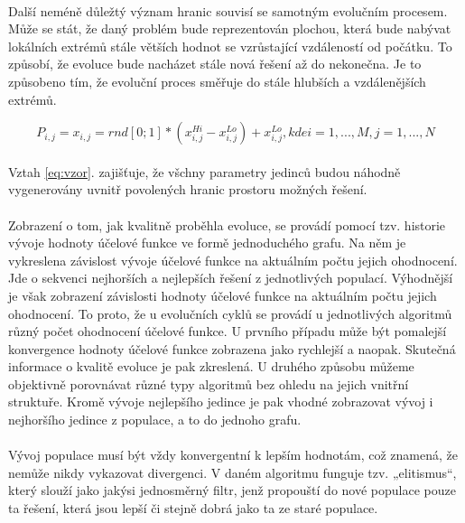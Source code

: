 \documentclass[bc,male,java,dept460]{diploma}		%
\begin{document}
\paragraph*{}
Další neméně důležtý význam hranic souvisí se samotným evolučním procesem. Může se stát, že daný problém bude reprezentován plochou, která bude nabývat lokálních extrémů stále větších hodnot se vzrůstající vzdáleností od počátku. To způsobí, že evoluce bude nacházet stále nová řešení až do nekonečna. Je to způsobeno tím, že evoluční proces směřuje do stále hlubších a vzdálenějších extrémů.

\begin{equation}
P_{i,j}=x_{i,j}=rnd[0;1]*(x_{i,j}^{Hi}-x_{i,j}^{Lo})+x_{i,j}^{Lo}, kde i=1,...,M, j=1,...,N
\label{eq:vzor}
\end{equation}


\paragraph*{}
Vztah \ref{eq:vzor}. zajišťuje, že všchny parametry jedinců budou náhodně vygenerovány uvnitř povolených hranic prostoru možných řešení.

\paragraph*{}
Zobrazení o tom, jak kvalitně proběhla evoluce, se provádí pomocí tzv. historie vývoje hodnoty účelové funkce ve formě jednoduchého grafu. Na něm je vykreslena závislost vývoje účelové funkce na aktuálním počtu jejich ohodnocení. Jde o sekvenci nejhorších a nejlepších řešení z jednotlivých populací. Výhodnější je však zobrazení závislosti hodnoty účelové funkce na aktuálním počtu jejich ohodnocení. To proto, že u evolučních cyklů se provádí u jednotlivých algoritmů různý počet ohodnocení účelové funkce. U prvního případu může být pomalejší konvergence hodnoty účelové funkce zobrazena jako rychlejší a naopak. Skutečná informace o kvalitě evoluce je pak zkreslená. U druhého způsobu můžeme objektivně porovnávat různé typy algoritmů bez ohledu na jejich vnitřní struktuře. Kromě vývoje nejlepšího jedince je pak vhodné zobrazovat vývoj i nejhoršího jedince z populace, a to do jednoho grafu.

\paragraph*{}
Vývoj populace musí být vždy konvergentní k lepším hodnotám, což znamená, že nemůže nikdy vykazovat divergenci. V daném algoritmu funguje tzv. „elitismus“, který slouží jako jakýsi jednosměrný filtr, jenž propouští do nové populace pouze ta řešení, která jsou lepší či stejně dobrá jako ta ze staré populace.
\end{document}
